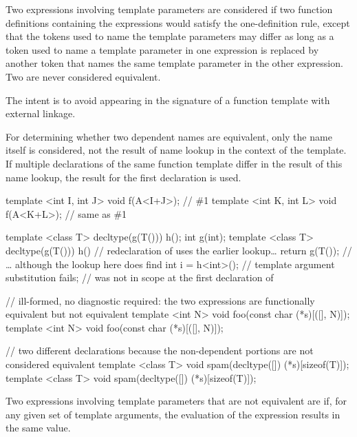 \pnum
{}%
Two expressions involving template parameters are considered
if two function definitions containing the expressions would satisfy
the one-definition rule, except that the tokens used
to name the template parameters may differ as long as a token used to
name a template parameter in one expression is replaced by another token
that names the same template parameter in the other expression.
Two  are never considered equivalent.
\begin{note}
The intent is to avoid  appearing in the
signature of a function template with external linkage.
\end{note}
For determining whether two dependent names are
equivalent, only the name itself is considered, not the result of name
lookup in the context of the template. If multiple declarations of the
same function template differ in the result of this name lookup, the
result for the first declaration is used.
\begin{example}
\begin{codeblock}
template <int I, int J> void f(A<I+J>);         // \#1
template <int K, int L> void f(A<K+L>);         // same as \#1

template <class T> decltype(g(T())) h();
int g(int);
template <class T> decltype(g(T())) h()         // redeclaration of  uses the earlier lookup\ldots
  { return g(T()); }                            // \ldots{} although the lookup here does find 
int i = h<int>();                               // template argument substitution fails; 
                                                // was not in scope at the first declaration of 

// ill-formed, no diagnostic required: the two expressions are functionally equivalent but not equivalent
template <int N> void foo(const char (*s)[([]{}, N)]);
template <int N> void foo(const char (*s)[([]{}, N)]);

// two different declarations because the non-dependent portions are not considered equivalent
template <class T> void spam(decltype([]{}) (*s)[sizeof(T)]);
template <class T> void spam(decltype([]{}) (*s)[sizeof(T)]);
\end{codeblock}
\end{example}
%
Two expressions involving template parameters that are not equivalent are
if, for any given set of template arguments, the evaluation of the
expression results in the same value.

